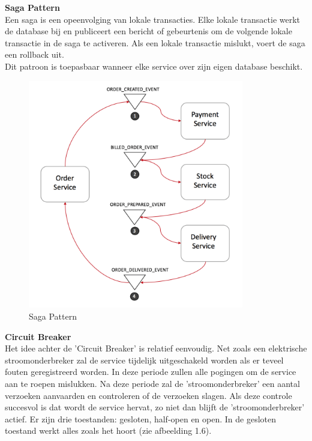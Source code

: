 \textbf{Saga Pattern}
\\Een saga is een opeenvolging van lokale transacties. Elke lokale transactie werkt de database bij en publiceert een bericht of gebeurtenis om de volgende lokale transactie in de saga te activeren. Als een lokale transactie mislukt, voert de saga een rollback uit.\\
Dit patroon is toepasbaar wanneer elke service over zijn eigen database beschikt.

\begin{figure}[!htb]
    \caption{Saga Pattern}
    \centering
    \includegraphics[height=10cm]{Saga.png}
\end{figure}

\textbf{Circuit Breaker}\\
Het idee achter de 'Circuit Breaker' is relatief eenvoudig. Net zoals een elektrische stroomonderbreker zal de service tijdelijk uitgeschakeld worden als er teveel fouten geregistreerd worden. In deze periode zullen alle pogingen om de service aan te roepen mislukken. Na deze periode zal de 'stroomonderbreker' een aantal verzoeken aanvaarden en controleren of de verzoeken slagen. Als deze controle succesvol is dat wordt de service hervat, zo niet dan blijft de 'stroomonderbreker' actief.
Er zijn drie toestanden: gesloten, half-open en open. In de gesloten toestand werkt alles zoals het hoort (zie afbeelding 1.6). 

